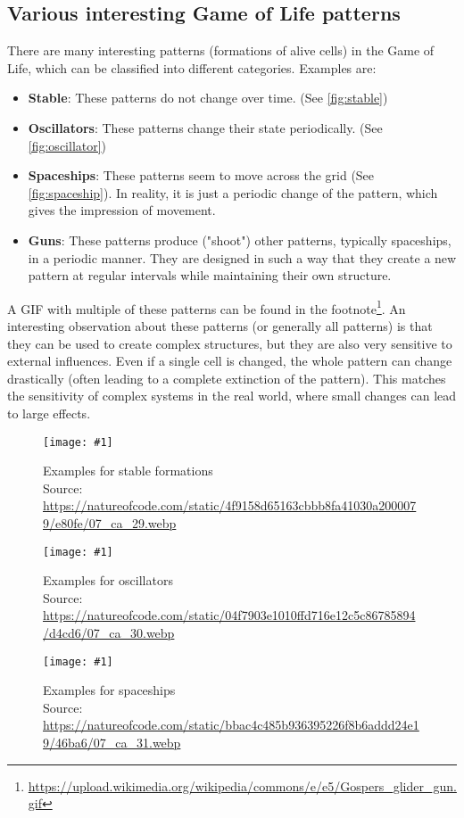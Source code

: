 \documentclass[a4paper,12pt]{llncs}
\numberwithin{equation}{section}
\newcommand{\imagewithwidth}[5]{
  \begin{figure}[htbp]%
    \begin{center}%
      \texttt{[image: \#1]}%
      \caption[#5]{#4}%
      \label{#3}%
    \end{center}%
  \end{figure}
}
\begin{document}
\subsection{Various interesting Game of Life patterns}
There are many interesting patterns (formations of alive cells) in the Game of Life, which can be classified into different categories. Examples are:
\begin{itemize}
  \item \textbf{Stable}: These patterns do not change over time. (See \autoref{fig:stable})
  \item \textbf{Oscillators}: These patterns change their state periodically. (See \autoref{fig:oscillator})
  \item \textbf{Spaceships}: These patterns seem to move across the grid (See \autoref{fig:spaceship}). In reality, it is just a periodic change of the pattern, which gives the impression of movement.
  \item \textbf{Guns}: These patterns produce ("shoot") other patterns, typically spaceships, in a periodic manner. They are designed in such a way that they create a new pattern at regular intervals while maintaining their own structure.
\end{itemize}
A GIF with multiple of these patterns can be found in the footnote\footnote{\url{https://upload.wikimedia.org/wikipedia/commons/e/e5/Gospers_glider_gun.gif}}.
An interesting observation about these patterns (or generally all patterns) is that they can be used to create complex structures,
but they are also very sensitive to external influences. Even if a single cell is changed, the whole pattern can change drastically (often leading to a complete extinction of the pattern).
This matches the sensitivity of complex systems in the real world, where small changes can lead to large effects.
\imagewithwidth{figures/stable}{0.4\textwidth}{fig:stable}{Examples for stable formations\\Source: \url{https://natureofcode.com/static/4f9158d65163cbbb8fa41030a2000079/e80fe/07_ca_29.webp}}{}
\imagewithwidth{figures/oscillator}{0.4\textwidth}{fig:oscillator}{Examples for oscillators\\Source: \url{https://natureofcode.com/static/04f7903e1010ffd716e12c5c86785894/d4cd6/07_ca_30.webp}}{}
\imagewithwidth{figures/spaceship}{0.4\textwidth}{fig:spaceship}{Examples for spaceships\\Source: \url{https://natureofcode.com/static/bbac4c485b936395226f8b6addd24e19/46ba6/07_ca_31.webp}}{}
\end{document}
